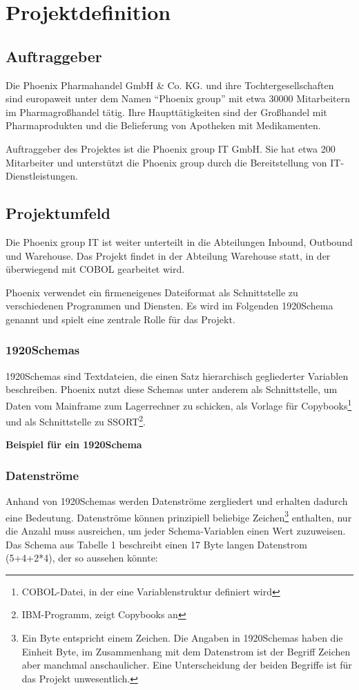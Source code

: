 \section{Projektdefinition}
\label{sec:Einleitung}
\subsection{Auftraggeber}
\label{sec:Auftraggeber}
Die Phoenix Pharmahandel GmbH \& Co. KG. und ihre Tochtergesellschaften sind europaweit unter dem Namen ``Phoenix group'' mit etwa 30000 Mitarbeitern im Pharmagroßhandel tätig. Ihre Haupttätigkeiten sind der Großhandel mit Pharmaprodukten und die Belieferung von Apotheken mit Medikamenten.

Auftraggeber des Projektes ist die Phoenix group IT GmbH. Sie hat etwa 200 Mitarbeiter und unterstützt die Phoenix group durch die Bereitstellung von IT-Dienstleistungen.

\subsection{Projektumfeld} 
\label{sec:Projektumfeld}
Die Phoenix group IT ist weiter unterteilt in die Abteilungen Inbound, Outbound und Warehouse. Das Projekt findet in der Abteilung Warehouse statt, in der überwiegend mit COBOL gearbeitet wird.

Phoenix verwendet ein firmeneigenes Dateiformat als Schnittstelle zu verschiedenen Programmen und Diensten. Es wird im Folgenden 1920Schema genannt und spielt eine zentrale Rolle für das Projekt.

\subsubsection{1920Schemas}
1920Schemas sind Textdateien, die einen Satz hierarchisch gegliederter Variablen beschreiben. Phoenix nutzt diese Schemas unter anderem als Schnittstelle, um Daten vom Mainframe zum Lagerrechner zu schicken, als Vorlage für Copybooks\footnote{COBOL-Datei, in der eine Variablenstruktur definiert wird} und als Schnittstelle zu SSORT\footnote{IBM-Programm, zeigt Copybooks an}.

\textbf{Beispiel für ein 1920Schema}

\subsubsection{Datenströme}
Anhand von 1920Schemas werden Datenströme zergliedert und erhalten dadurch eine Bedeutung. Datenströme können prinzipiell beliebige Zeichen\footnote{Ein Byte entspricht einem Zeichen. Die Angaben in 1920Schemas haben die Einheit Byte, im Zusammenhang mit dem Datenstrom ist der Begriff Zeichen aber manchmal anschaulicher. Eine Unterscheidung der beiden Begriffe ist für das Projekt unwesentlich.} enthalten, nur die Anzahl muss ausreichen, um jeder Schema-Variablen einen Wert zuzuweisen. Das Schema aus Tabelle 1 beschreibt einen 17 Byte langen Datenstrom (5+4+2*4), der so aussehen könnte:

